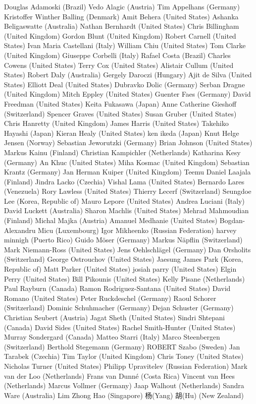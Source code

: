 Douglas Adamoski (Brazil)
Vedo Alagic (Austria)
Tim Appelhans (Germany)
Kristoffer Winther Balling (Denmark)
Amit Behera (United States)
Ashanka Beligaswatte (Australia)
Nathan Bernhardt (United States)
Chris Billingham (United Kingdom)
Gordon Blunt (United Kingdom)
Robert Carnell (United States)
Ivan Maria Castellani (Italy)
William Chiu (United States)
Tom Clarke (United Kingdom)
Giuseppe Corbelli (Italy)
Rafael Costa (Brazil)
Charles Cowens (United States)
Terry Cox (United States)
Alistair Cullum (United States)
Robert Daly (Australia)
Gergely Daroczi (Hungary)
Ajit de Silva (United States)
Elliott Deal (United States)
Dubravko Dolic (Germany)
Serban Dragne (United Kingdom)
Mitch Eppley (United States)
Guenter Faes (Germany)
David Freedman (United States)
Keita Fukasawa (Japan)
Anne Catherine Gieshoff (Switzerland)
Spencer Graves (United States)
Susan Gruber (United States)
Chris Hanretty (United Kingdom)
James Harris (United States)
Takehiko Hayashi (Japan)
Kieran Healy (United States)
ken ikeda (Japan)
Knut Helge Jensen (Norway)
Sebastian Jeworutzki (Germany)
Brian Johnson (United States)
Markus Kainu (Finland)
Christian Kampichler (Netherlands)
Katharina Kesy (Germany)
An Khuc (United States)
Miha Kosmac (United Kingdom)
Sebastian Krantz (Germany)
Jan Herman Kuiper (United Kingdom)
Teemu Daniel Laajala (Finland)
Jindra Lacko (Czechia)
Vishal Lama (United States)
Bernardo Lares (Venezuela)
Rory Lawless (United States)
Thierry Lecerf (Switzerland)
Seungdoe Lee (Korea, Republic of)
Mauro Lepore (United States)
Andrea Luciani (Italy)
David Luckett (Australia)
Sharon Machlis (United States)
Mehrad Mahmoudian (Finland)
Michal Majka (Austria)
Amanuel Medhanie (United States)
Bogdan-Alexandru Micu (Luxembourg)
Igor Mikheenko (Russian Federation)
harvey minnigh (Puerto Rico)
Guido Möser (Germany)
Markus Näpflin (Switzerland)
Mark Niemann-Ross (United States)
Jens Oehlschlägel (Germany)
Dan Orsholits (Switzerland)
George Ostrouchov (United States)
Jaesung James Park (Korea, Republic of)
Matt Parker (United States)
josiah parry (United States)
Elgin Perry (United States)
Bill Pikounis (United States)
Kelly Pisane (Netherlands)
Paul Rayburn (Canada)
Ramon Rodriguez-Santana (United States)
David Romano (United States)
Peter Ruckdeschel (Germany)
Raoul Schorer (Switzerland)
Dominic Schuhmacher (Germany)
Dejan Schuster (Germany)
Christian Seubert (Austria)
Jagat Sheth (United States)
Sindri Shtepani (Canada)
David Sides (United States)
Rachel Smith-Hunter (United States)
Murray Sondergard (Canada)
Matteo Starri (Italy)
Marco Steenbergen (Switzerland)
Berthold Stegemann (Germany)
ROBERT Szabo (Sweden)
Jan Tarabek (Czechia)
Tim Taylor (United Kingdom)
Chris Toney (United States)
Nicholas Turner (United States)
Philipp Upravitelev (Russian Federation)
Mark van der Loo (Netherlands)
Frans van Dunné (Costa Rica)
Vincent van Hees (Netherlands)
Marcus Vollmer (Germany)
Jaap Walhout (Netherlands)
Sandra Ware (Australia)
Lim Zhong Hao (Singapore)
杨(Yang) 胡(Hu) (New Zealand)


\address{%
Torsten Hothorn\\
Universität Zürich\\%
Switzerland\\
%
%
\textit{ORCiD: \href{https://orcid.org/0000-0001-8301-0471}{0000-0001-8301-0471}}\\%
\href{mailto:Torsten.Hothorn@R-project.org}{\nolinkurl{Torsten.Hothorn@R-project.org}}%
}
